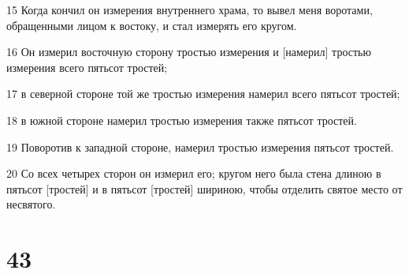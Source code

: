 \par 15 Когда кончил он измерения внутреннего храма, то вывел меня воротами, обращенными лицом к востоку, и стал измерять его кругом.
\par 16 Он измерил восточную сторону тростью измерения и [намерил] тростью измерения всего пятьсот тростей;
\par 17 в северной стороне той же тростью измерения намерил всего пятьсот тростей;
\par 18 в южной стороне намерил тростью измерения также пятьсот тростей.
\par 19 Поворотив к западной стороне, намерил тростью измерения пятьсот тростей.
\par 20 Со всех четырех сторон он измерил его; кругом него была стена длиною в пятьсот [тростей] и в пятьсот [тростей] шириною, чтобы отделить святое место от несвятого.

\chapter{43}

